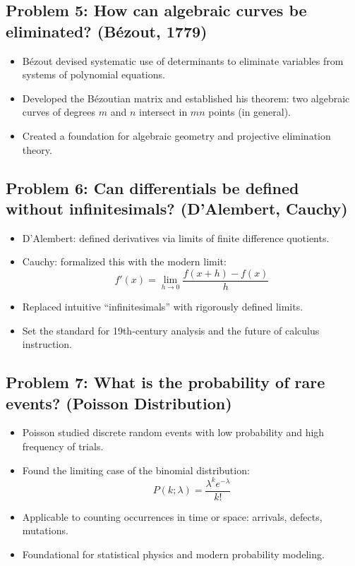 \documentclass[9pt]{article}
\begin{document}
\subsection*{Problem 5: How can algebraic curves be eliminated? (Bézout, 1779)}
\begin{itemize}
  \item Bézout devised systematic use of determinants to eliminate variables from systems of polynomial equations.
  \item Developed the Bézoutian matrix and established his theorem: two algebraic curves of degrees \( m \) and \( n \) intersect in \( mn \) points (in general).
  \item Created a foundation for algebraic geometry and projective elimination theory.
\end{itemize}

\subsection*{Problem 6: Can differentials be defined without infinitesimals? (D’Alembert, Cauchy)}
\begin{itemize}
  \item D’Alembert: defined derivatives via limits of finite difference quotients.
  \item Cauchy: formalized this with the modern limit:
  \[
  f'(x) = \lim_{h \to 0} \frac{f(x+h) - f(x)}{h}
  \]
  \item Replaced intuitive “infinitesimals” with rigorously defined limits.
  \item Set the standard for 19th-century analysis and the future of calculus instruction.
\end{itemize}

\subsection*{Problem 7: What is the probability of rare events? (Poisson Distribution)}
\begin{itemize}
  \item Poisson studied discrete random events with low probability and high frequency of trials.
  \item Found the limiting case of the binomial distribution:
  \[
  P(k; \lambda) = \frac{\lambda^k e^{-\lambda}}{k!}
  \]
  \item Applicable to counting occurrences in time or space: arrivals, defects, mutations.
  \item Foundational for statistical physics and modern probability modeling.
\end{itemize}
\end{document}
